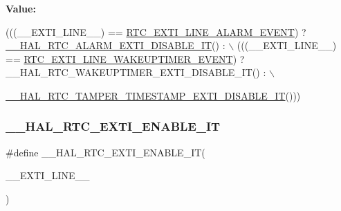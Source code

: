 {\bfseries Value\+:}
\begin{DoxyCode}
(((\_\_EXTI\_LINE\_\_) == \hyperlink{group___r_t_c___private___constants_gaeffe9b89372b06df1c0eff2f4346682b}{RTC\_EXTI\_LINE\_ALARM\_EVENT}) ? 
      \hyperlink{group___r_t_c___exported___macros_gaa6cd8249ed39c941d83f77ce507b8e0a}{\_\_HAL\_RTC\_ALARM\_EXTI\_DISABLE\_IT}() : \(\backslash\)
                                                  (((\_\_EXTI\_LINE\_\_) == 
      \hyperlink{group___r_t_c_ex___private___constants_ga1a1a58e244663850786c387bfa5474f2}{RTC\_EXTI\_LINE\_WAKEUPTIMER\_EVENT}) ? \_\_HAL\_RTC\_WAKEUPTIMER\_EXTI\_DISABLE\_IT() :
       \(\backslash\)
                                                      
      \hyperlink{group___r_t_c_ex___tamper___timestamp_ga5c1481eec3337b2382fc08d19a856d71}{\_\_HAL\_RTC\_TAMPER\_TIMESTAMP\_EXTI\_DISABLE\_IT}()))
\end{DoxyCode}
\mbox{\label{group___h_a_l___r_t_c___aliased___macros_ga16764e0df245c740813dbeb302e67da5}} 
\subsubsection{\texorpdfstring{\+\_\+\+\_\+\+H\+A\+L\+\_\+\+R\+T\+C\+\_\+\+E\+X\+T\+I\+\_\+\+E\+N\+A\+B\+L\+E\+\_\+\+IT}{\_\_HAL\_RTC\_EXTI\_ENABLE\_IT}}
{\footnotesize\ttfamily \#define \+\_\+\+\_\+\+H\+A\+L\+\_\+\+R\+T\+C\+\_\+\+E\+X\+T\+I\+\_\+\+E\+N\+A\+B\+L\+E\+\_\+\+IT(\begin{DoxyParamCaption}\item[{}]{\+\_\+\+\_\+\+E\+X\+T\+I\+\_\+\+L\+I\+N\+E\+\_\+\+\_\+ }\end{DoxyParamCaption})}

